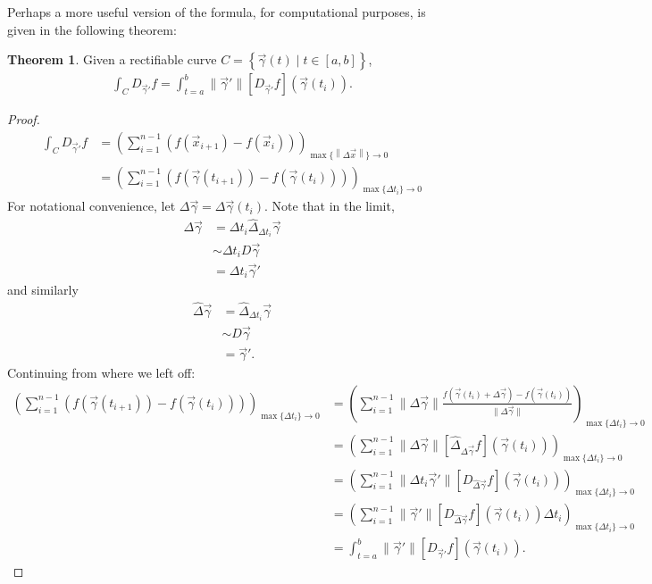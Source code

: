 \documentclass{article}
\theoremstyle{definition}
\newtheorem{thm}{Theorem}[subsubsection]
\begin{document}
Perhaps a more useful version of the formula, for computational purposes, is given in the following theorem:
\begin{thm}
	Given a rectifiable curve $C=\left\{\vec\gamma(t)\mid t\in[a,b]\right\}$,
	\begin{align*}
		\int_CD_{\vec\gamma'}f=\int_{t=a}^b\lVert \vec\gamma'\rVert\left[D_{\vec\gamma'}f\right]\left(\vec\gamma (t_i)\right).
	\end{align*}
\end{thm}
\begin{proof}
	\begin{align*}
		\int_CD_{\vec\gamma'}f&=\left(\sum_{i=1}^{n-1}\left(f(\vec x_{i+1})-f(\vec x_i)\right)\right)_{\max\{\left\lVert\Delta\vec x\right\rVert\}\rightarrow0}\\
		&=\left(\sum_{i=1}^{n-1}\left(f(\vec\gamma(t_{i+1}))-f(\vec\gamma(t_i))\right)\right)_{\max\{\Delta t_i\}\rightarrow0}
	\end{align*}
	For notational convenience, let $\Delta\vec\gamma=\Delta\vec\gamma(t_i)$. Note that in the limit,
	\begin{align*}
		\Delta\vec\gamma&=\Delta t_i\hat{\Delta}_{\Delta t_i}\vec\gamma\\
		&\sim\Delta t_iD\vec\gamma\\
		&=\Delta t_i\vec\gamma'
	\end{align*}
	and similarly
	\begin{align*}
		\hat{\Delta}\vec\gamma&=\hat{\Delta}_{\Delta t_i}\vec\gamma\\
		&\sim D\vec\gamma\\
		&=\vec\gamma'.
	\end{align*}
	Continuing from where we left off:
	\begin{align*}
		\left(\sum_{i=1}^{n-1}\left(f(\vec\gamma(t_{i+1}))-f(\vec\gamma(t_i))\right)\right)_{\max\{\Delta t_i\}\rightarrow0}&=\left(\sum_{i=1}^{n-1}\lVert\Delta\vec\gamma\rVert\frac{f(\vec\gamma(t_i)+\Delta\vec\gamma)-f(\vec\gamma(t_i))}{\lVert\Delta\vec\gamma\rVert}\right)_{\max\{\Delta t_i\}\rightarrow0}\\
		&=\left(\sum_{i=1}^{n-1}\lVert\Delta\vec\gamma\rVert\left[\hat{\Delta}_{\Delta\vec\gamma}f\right]\left(\vec\gamma (t_i)\right)\right)_{\max\{\Delta t_i\}\rightarrow0}\\
		&=\left(\sum_{i=1}^{n-1}\lVert\Delta t_i\vec\gamma'\rVert\left[D_{\hat{\Delta}\vec\gamma}f\right]\left(\vec\gamma (t_i)\right)\right)_{\max\{\Delta t_i\}\rightarrow0}\\
		&=\left(\sum_{i=1}^{n-1}\lVert \vec\gamma'\rVert\left[D_{\hat{\Delta}\vec\gamma}f\right]\left(\vec\gamma (t_i)\right)\Delta t_i\right)_{\max\{\Delta t_i\}\rightarrow0}\\
		&=\int_{t=a}^b\lVert \vec\gamma'\rVert\left[D_{\vec\gamma'}f\right]\left(\vec\gamma (t_i)\right).
	\end{align*}
\end{proof}
\end{document}
